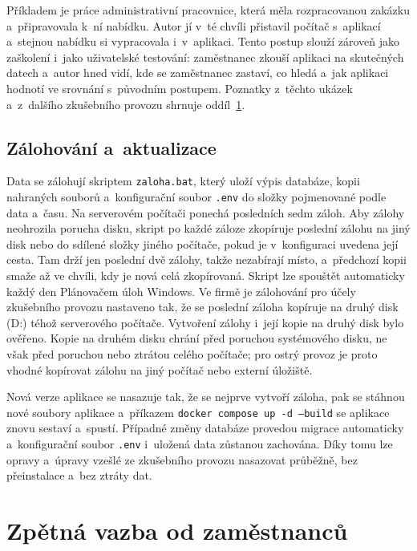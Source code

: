 Příkladem je práce administrativní pracovnice, která měla rozpracovanou zakázku a~připravovala k~ní nabídku. Autor jí v~té chvíli přistavil počítač s~aplikací a~stejnou nabídku si vypracovala i~v~aplikaci. Tento postup slouží zároveň jako zaškolení i~jako uživatelské testování: zaměstnanec zkouší aplikaci na skutečných datech a~autor hned vidí, kde se zaměstnanec zastaví, co hledá a~jak aplikaci hodnotí ve srovnání s~původním postupem. Poznatky z~těchto ukázek a~z~dalšího zkušebního provozu shrnuje oddíl~\ref{sec:zpetna-vazba}.

\subsection{Zálohování a~aktualizace}\label{sec:zalohovani}

Data se zálohují skriptem \texttt{zaloha.bat}, který uloží výpis databáze, kopii nahraných souborů a~konfigurační soubor \texttt{.env} do složky pojmenované podle data a~času. Na serverovém počítači ponechá posledních sedm záloh. Aby zálohy neohrozila porucha disku, skript po každé záloze zkopíruje poslední zálohu na jiný disk nebo do sdílené složky jiného počítače, pokud je v~konfiguraci uvedena její cesta. Tam drží jen poslední dvě zálohy, takže nezabírají místo, a~předchozí kopii smaže až ve chvíli, kdy je nová celá zkopírovaná. Skript lze spouštět automaticky každý den Plánovačem úloh Windows. Ve firmě je zálohování pro účely zkušebního provozu nastaveno tak, že se poslední záloha kopíruje na druhý disk (D:) téhož serverového počítače. Vytvoření zálohy i~její kopie na druhý disk bylo ověřeno. Kopie na druhém disku chrání před poruchou systémového disku, ne však před poruchou nebo ztrátou celého počítače; pro ostrý provoz je proto vhodné kopírovat zálohu na jiný počítač nebo externí úložiště.

Nová verze aplikace se nasazuje tak, že se nejprve vytvoří záloha, pak se stáhnou nové soubory aplikace a~příkazem \texttt{docker compose up -d --build} se aplikace znovu sestaví a~spustí. Případné změny databáze provedou migrace automaticky a~konfigurační soubor \texttt{.env} i~uložená data zůstanou zachována. Díky tomu lze opravy a~úpravy vzešlé ze zkušebního provozu nasazovat průběžně, bez přeinstalace a~bez ztráty dat.

\section{Zpětná vazba od zaměstnanců}\label{sec:zpetna-vazba}

